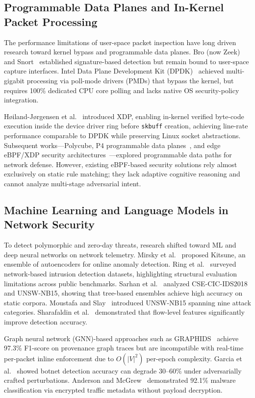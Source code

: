 \documentclass[journal]{IEEEtran}
\renewcommand{\_}{\textunderscore\allowbreak}
\begin{document}
\subsection{Programmable Data Planes and In-Kernel Packet Processing}
The performance limitations of user-space packet inspection have long driven
research toward kernel bypass and programmable data planes. Bro (now
Zeek)~\cite{paxson1999bro} and Snort~\cite{roesch1999snort} established
signature-based detection but remain bound to user-space capture interfaces.
Intel Data Plane Development Kit (DPDK)~\cite{intel2022dpdk} achieved
multi-gigabit processing via poll-mode drivers (PMDs) that bypass the kernel,
but requires 100\% dedicated CPU core polling and lacks native OS
security-policy integration.

H{\o}iland-J{\o}rgensen et al.~\cite{hoiland2018express} introduced XDP, enabling
in-kernel verified byte-code execution inside the device driver ring before
\texttt{sk\_buff} creation, achieving line-rate performance comparable to DPDK
while preserving Linux socket abstractions. Subsequent works---Polycube, P4
programmable data planes~\cite{bosshart2014p4}, and edge eBPF/XDP security
architectures~\cite{vieira2020fast,miano2018introducing,miano2018creating}---explored programmable
data paths for network defense. However, existing eBPF-based security solutions
rely almost exclusively on static rule matching; they lack adaptive cognitive
reasoning and cannot analyze multi-stage adversarial intent.

\subsection{Machine Learning and Language Models in Network Security}
To detect polymorphic and zero-day threats, research shifted toward ML and deep
neural networks on network telemetry. Mirsky et al.~\cite{mirsky2018kitsune}
proposed Kitsune, an ensemble of autoencoders for online anomaly detection.
Ring et al.~\cite{ring2019survey} surveyed network-based intrusion detection
datasets, highlighting structural evaluation limitations across public benchmarks.
Sarhan et al.~\cite{sarhan2022standard} analyzed CSE-CIC-IDS2018 and UNSW-NB15,
showing that tree-based ensembles achieve high accuracy on static corpora.
Moustafa and Slay~\cite{moustafa2015unsw} introduced UNSW-NB15 spanning nine
attack categories. Sharafaldin et al.~\cite{sharafaldin2018toward} demonstrated
that flow-level features significantly improve detection accuracy.

Graph neural network (GNN)-based approaches such as GRAPHIDS~\cite{zhao2023graphids}
achieve 97.3\% F1-score on provenance graph traces but are incompatible with
real-time per-packet inline enforcement due to $O(|V|^2)$ per-epoch complexity.
Garcia et al.~\cite{garcia2014empirical} showed botnet detection accuracy can
degrade 30--60\% under adversarially crafted perturbations. Anderson and
McGrew~\cite{anderson2016identifying} demonstrated 92.1\% malware classification
via encrypted traffic metadata without payload decryption.
\end{document}
